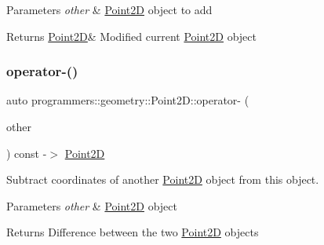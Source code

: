 \begin{DoxyParams}{Parameters}
{\em other} & \hyperlink{classprogrammers_1_1geometry_1_1Point2D}{Point2D} object to add \\
\hline
\end{DoxyParams}
\begin{DoxyReturn}{Returns}
\hyperlink{classprogrammers_1_1geometry_1_1Point2D}{Point2D}\& Modified current \hyperlink{classprogrammers_1_1geometry_1_1Point2D}{Point2D} object 
\end{DoxyReturn}
\mbox{\label{classprogrammers_1_1geometry_1_1Point2D_a3b2cf6b925ad0dd8c2b91e67e66cdab5}} 
\subsubsection{\texorpdfstring{operator-\/()}{operator-()}}
{\footnotesize\ttfamily auto programmers\+::geometry\+::\+Point2\+D\+::operator-\/ (\begin{DoxyParamCaption}\item[{const \hyperlink{classprogrammers_1_1geometry_1_1Point2D}{Point2D} \&}]{other }\end{DoxyParamCaption}) const -\/$>$  \hyperlink{classprogrammers_1_1geometry_1_1Point2D}{Point2D}}



Subtract coordinates of another \hyperlink{classprogrammers_1_1geometry_1_1Point2D}{Point2D} object from this object. 


\begin{DoxyParams}{Parameters}
{\em other} & \hyperlink{classprogrammers_1_1geometry_1_1Point2D}{Point2D} object \\
\hline
\end{DoxyParams}
\begin{DoxyReturn}{Returns}
Difference between the two \hyperlink{classprogrammers_1_1geometry_1_1Point2D}{Point2D} objects 
\end{DoxyReturn}
\mbox{\label{classprogrammers_1_1geometry_1_1Point2D_a8fd22e413a3145b405cbb66184236ffb}} 
